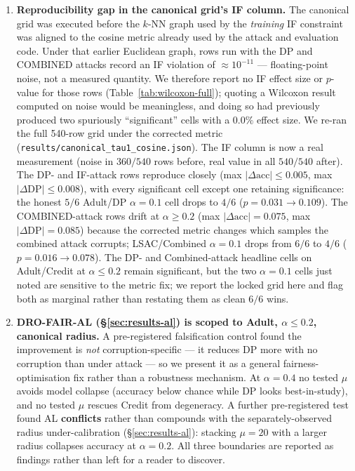 \begin{enumerate}
\item \textbf{Reproducibility gap in the canonical grid's IF column.}
The canonical grid was executed before the $k$-NN graph used by the
\emph{training} IF constraint was aligned to the cosine metric already
used by the attack and evaluation code. Under that earlier Euclidean
graph, rows run with the DP and COMBINED attacks record an IF violation
of $\approx10^{-11}$ --- floating-point noise, not a measured quantity.
We therefore report no IF effect size or $p$-value for those rows
(Table~\ref{tab:wilcoxon-full}); quoting a Wilcoxon result computed on
noise would be meaningless, and doing so had previously produced two
spuriously ``significant'' cells with a $0.0\%$ effect size. We re-ran
the full 540-row grid under the corrected metric
(\texttt{results/canonical\_tau1\_cosine.json}). The IF column is now a
real measurement (noise in $360/540$ rows before, real value in all
$540/540$ after). The DP- and IF-attack rows reproduce closely (max
$|\Delta \mathrm{acc}| \le 0.005$, max $|\Delta \mathrm{DP}| \le 0.008$),
with every significant cell except one retaining significance: the honest
$5/6$ Adult/DP $\alpha{=}0.1$ cell drops to $4/6$ ($p{=}0.031\to0.109$).
The COMBINED-attack rows drift at $\alpha \ge 0.2$ (max $|\Delta
\mathrm{acc}| = 0.075$, max $|\Delta \mathrm{DP}| = 0.085$) because the
corrected metric changes which samples the combined attack corrupts;
LSAC/Combined $\alpha{=}0.1$ drops from $6/6$ to $4/6$
($p{=}0.016\to0.078$). The DP- and Combined-attack headline cells on
Adult/Credit at $\alpha\le0.2$ remain significant, but the two $\alpha{=}0.1$
cells just noted are sensitive to the metric fix; we report the locked
grid here and flag both as marginal rather than restating them as clean
$6/6$ wins.

\item \textbf{DRO-FAIR-AL (\S\ref{sec:results-al}) is scoped to Adult,
$\alpha\le0.2$, canonical radius.} A pre-registered falsification control
found the improvement is \emph{not} corruption-specific --- it reduces DP more
with no corruption than under attack --- so we present it as a general
fairness-optimisation fix rather than a robustness mechanism. At
$\alpha{=}0.4$ no tested $\mu$ avoids model collapse (accuracy below chance
while DP looks best-in-study), and no tested $\mu$ rescues Credit from
degeneracy. A further pre-registered test found AL \textbf{conflicts} rather
than compounds with the separately-observed radius under-calibration
(\S\ref{sec:results-al}): stacking $\mu{=}20$ with a larger radius collapses
accuracy at $\alpha{=}0.2$. All three boundaries are reported as findings
rather than left for a reader to discover.
\end{enumerate}

